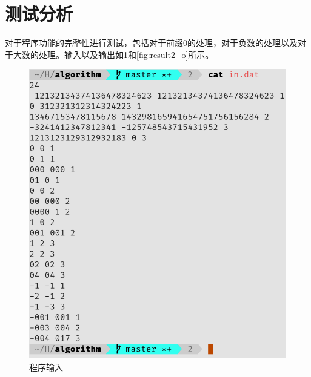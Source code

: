 \documentclass{report}
\begin{document}
\section{测试分析}
\label{sec:ce_shi_fen_xi_2}
对于程序功能的完整性进行测试，包括对于前缀0的处理，对于负数的处理以及对于大数的处理。输入以及输出如\ref{fig:result2_i}和\ref{fig:result2_o}所示。
\begin{figure}[ht]
    \centering
    \begin{minipage}{.375\textwidth}
        \includegraphics[height=0.3\textheight]{result2_i.png}
        \caption{程序输入}
        \label{fig:result2_i}
    \end{minipage}
    \begin{minipage}{.3\textwidth}

\end{minipage}
\end{figure}
\end{document}
